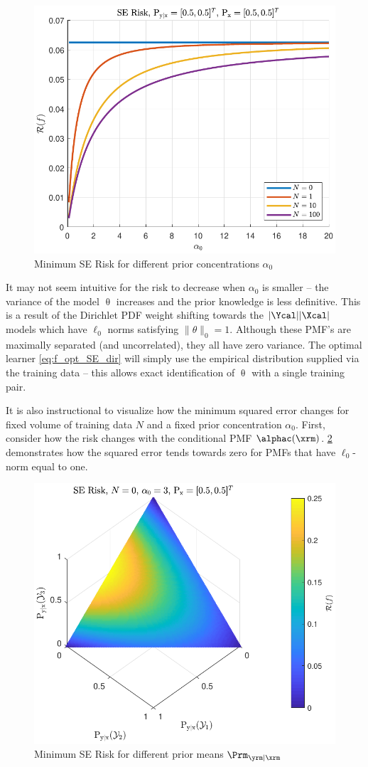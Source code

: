 \documentclass[12pt]{report}
\begin{document}
\begin{figure}
\centering
\includegraphics[width=0.7\linewidth]{Risk_SE_Dir_IO_a0_leg_N.pdf}
\caption{Minimum SE Risk for different prior concentrations $\alpha_0$}
\label{fig:Risk_SE_Dir_IO_a0_leg_N}
\end{figure}

It may not seem intuitive for the risk to decrease when $\alpha_0$ is smaller -- the variance of the model $\uptheta$ increases and the prior knowledge is less definitive. This is a result of the Dirichlet PDF weight shifting towards the $|\Ycal||\Xcal|$ models which have $\ell_0$ norms satisfying $\| \theta \|_0 = 1$. Although these PMF's are maximally separated (and uncorrelated), they all have zero variance. The optimal learner \eqref{eq:f_opt_SE_dir} will simply use the empirical distribution supplied via the training data -- this allows exact identification of $\uptheta$ with a single training pair.

It is also instructional to visualize how the minimum squared error changes for fixed volume of training data $N$ and a fixed prior concentration $\alpha_0$. First, consider how the risk changes with the conditional PMF $\alphac(\xrm)$. \cref{fig:Risk_SE_Dir_IO_Pyx} demonstrates how the squared error tends towards zero for PMFs that have $\ell_0$-norm equal to one.
\begin{figure}
\centering
\includegraphics[width=0.7\linewidth]{Risk_SE_Dir_IO_Pyx.pdf}
\caption{Minimum SE Risk for different prior means $\Prm_{\yrm | \xrm}$}
\label{fig:Risk_SE_Dir_IO_Pyx}
\end{figure}
\end{document}
